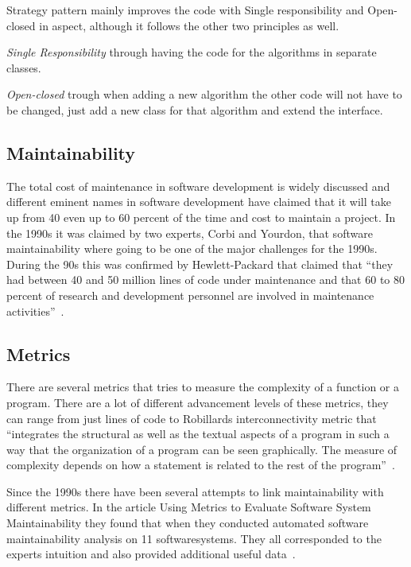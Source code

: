 \documentclass[conference, a4paper]{IEEEtran}
\begin{document}
Strategy pattern mainly improves the code with Single responsibility and Open-closed in aspect, although it follows the other two principles as well.

\textit{Single Responsibility} through having the code for the algorithms in separate classes.

\textit{Open-closed} trough when adding a new algorithm the other code will not have to be changed, just add a new class for that algorithm and extend the interface.
\\
\subsection{Maintainability}
\label{sec:Maintainability}
The total cost of maintenance in software development is widely discussed and different eminent names in software development have claimed that it will take up from 40 even up to 60 percent of the time and cost to maintain a project. In the 1990s it was claimed by two experts, Corbi and Yourdon, that software maintainability where going to be one of the major challenges for the 1990s. During the 90s this was confirmed by Hewlett-Packard that claimed that ``they had between 40 and 50 million lines of code under maintenance and that 60 to 80 percent of research and development personnel are involved in maintenance activities''~\cite{bibitem:MetricsToEvaluate}.
\\
\subsection{Metrics}
There are several metrics that tries to measure the complexity of a function or a program. There are a lot of different advancement levels of these metrics, they can range from just lines of code to Robillards interconnectivity metric that ``integrates the structural as well as the textual aspects of a program in such a way that the organization of a program can be seen graphically. The measure of complexity depends on how a statement is related to the rest of the program''~\cite{bibitem:Robillard}.

Since the 1990s there have been several attempts to link maintainability with different metrics. In the article Using Metrics to Evaluate Software System Maintainability they found that when they conducted automated software maintainability analysis on 11 softwaresystems. They all corresponded to the experts intuition and also provided additional useful data~\cite{bibitem:MetricsToEvaluate}.
\end{document}
